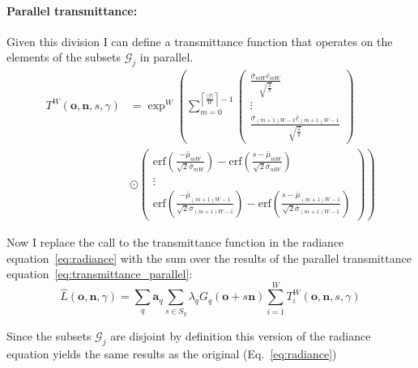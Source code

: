 \documentclass[a4paper, 11pt]{memoir}
\newcommand*{\erf}{\text{erf}}
\begin{document}
    \paragraph{Parallel \gls{transmittance}:}
    \label{par:parallel_transmittance}
    Given this division I can define a \gls{transmittance} function that operates on the elements of the subsets $\mathcal{G}_j$ in parallel.
    \begin{equation}
        \begin{aligned}
            T^W(\mathbf{o}, \mathbf{n}, s, \gamma) &= \exp^W\left( \sum_{m = 0}^{\left\lceil \frac{|\mathcal{G}|}{W} \right\rceil - 1}
            \begin{pmatrix}
                \frac{\bar{\sigma}_{mW}\bar{c}_{mW}}{\sqrt{\frac{2}{\pi}}} \\ \vdots \\\frac{\bar{\sigma}_{(m+1)W-1}\bar{c}_{(m+1)W-1}}{\sqrt{\frac{2}{\pi}}} 
            \end{pmatrix} \right.\\&\left.\odot \begin{pmatrix}
                \erf{\left( \frac{- \bar{\mu}_{mW}}{\sqrt{2}\bar{\sigma}_{mW}} \right) - \erf{\left( \frac{s - \bar{\mu}_{mW}}{\sqrt{2}\bar{\sigma}_{mW}} \right)}} \\
                \vdots \\
               \erf{\left( \frac{- \bar{\mu}_{(m+1)W - 1}}{\sqrt{2}\bar{\sigma}_{(m+1)W - 1}} \right) - \erf{\left( \frac{s - \bar{\mu}_{(m+1)W - 1}}{\sqrt{2}\bar{\sigma}_{(m+1)W - 1}} \right)}} 
            \end{pmatrix}\right)
        \end{aligned}
        \label{eq:transmittance_parallel}
    \end{equation}

    Now I replace the call to the \gls{transmittance} function in the \gls{radiance} equation~\eqref{eq:radiance} with the sum
    over the results of the parallel \gls{transmittance} equation~\eqref{eq:transmittance_parallel}:
    \begin{equation}
        \hat{L}(\mathbf{o}, \mathbf{n}, \gamma) = \sum_{q} \mathbf{a}_q \sum_{s \in S_q} \lambda_qG_q(\mathbf{o} + s\mathbf{n})\sum_{i = 1}^W T^W_i(\mathbf{o}, \mathbf{n}, s, \gamma)
    \end{equation}

    Since the subsets $\mathcal{G}_j$ are disjoint by definition this version of the \gls{radiance} equation yields the same results as the original (Eq.~\eqref{eq:radiance})
\end{document}
